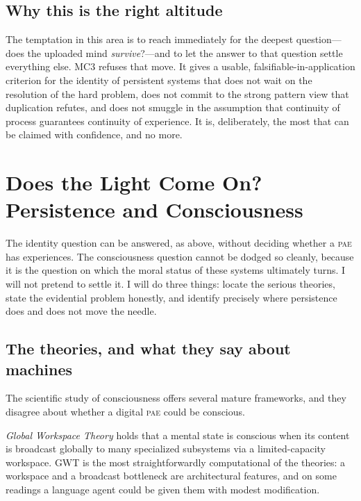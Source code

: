 \documentclass[11pt,a4paper]{article}
\theoremstyle{definition}
\newcommand{\pae}{\textsc{pae}\xspace}
\begin{document}
\subsection{Why this is the right altitude}

The temptation in this area is to reach immediately for the deepest question---does the uploaded mind \emph{survive}?---and to let the answer to that question settle everything else. MC3 refuses that move. It gives a usable, falsifiable-in-application criterion for the identity of persistent systems that does not wait on the resolution of the hard problem, does not commit to the strong pattern view that duplication refutes, and does not smuggle in the assumption that continuity of process guarantees continuity of experience. It is, deliberately, the most that can be claimed with confidence, and no more.

\section{Does the Light Come On? Persistence and Consciousness}
\label{sec:consciousness}

The identity question can be answered, as above, without deciding whether a \pae{} has experiences. The consciousness question cannot be dodged so cleanly, because it is the question on which the moral status of these systems ultimately turns. I will not pretend to settle it. I will do three things: locate the serious theories, state the evidential problem honestly, and identify precisely where persistence does and does not move the needle.

\subsection{The theories, and what they say about machines}

The scientific study of consciousness offers several mature frameworks, and they disagree about whether a digital \pae{} could be conscious.

\emph{Global Workspace Theory} \citep{baars1988,dehaene2017} holds that a mental state is conscious when its content is broadcast globally to many specialized subsystems via a limited-capacity workspace. GWT is the most straightforwardly computational of the theories: a workspace and a broadcast bottleneck are architectural features, and on some readings a language agent could be given them with modest modification.
\end{document}
